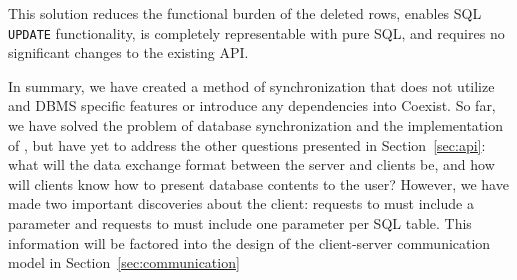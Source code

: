 This solution reduces the functional burden of the deleted rows, enables SQL
\texttt{UPDATE} functionality, is completely representable with pure SQL, and
requires no significant changes to the existing API. 



In summary, we have created a method of synchronization that does not utilize
and DBMS specific features or introduce any dependencies into Coexist. So far,
we have solved the problem of database synchronization and the implementation of
\sync, but have yet to address
the other questions presented in Section~\ref{sec:api}: what will the data
exchange format between the server and clients be, and how will clients know how
to present database contents to the user? However, we have made two important
discoveries about the client: requests to \create must include a
 parameter and requests to \sync must include one 
parameter per SQL table. This information will be factored into the design of
the client-server communication model in Section~\ref{sec:communication}

